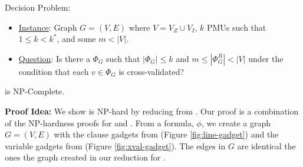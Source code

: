 \xvalpart Decision Problem:
\begin{itemize}
	\item \underline{Instance}: Graph $G=(V,E)$ where $V=V_Z \cup V_I$, $k$ PMUs such that $1 \leq k < k^*$, and some $m<|V|$.

	\item \underline{Question}: Is there a $\Phi_G$ such that $|\Phi_G| \leq k$ and $m \leq|\Phi^R_G| < |V|$ under the condition that each $v \in \Phi_G$ is cross-validated?
\end{itemize}



\begin{theorem}
\xvalpart is NP-Complete. %
\label{thm:npc-xvalpart}
\end{theorem}


{\bf Proof Idea:} We show \xvalpart is NP-hard by reducing from \sats. Our proof is a combination of the NP-hardness proofs for \maxinc and \xvals.
From a \sat formula, $\phi$, we create a graph $G=(V,E)$ with the clause gadgets from \maxinc (Figure \ref{fig:line-gadget}) and the variable gadgets from \xval (Figure \ref{fig:xval-gadget}).
The edges in $G$ are identical the ones the graph created in our reduction for \xvals.

